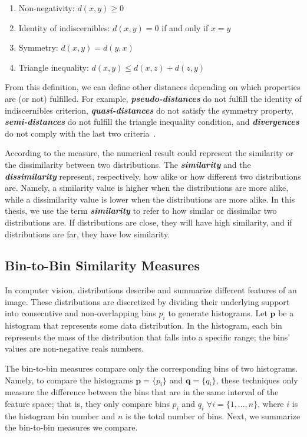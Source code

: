 \begin{enumerate}%
 \item Non-negativity: $d(x, y)\geq 0$
 \item Identity of indiscernibles: $d(x, y) = 0$ if and only if $x = y$
 \item Symmetry: $d(x, y) = d(y, x)$
 \item Triangle inequality: $d(x, y) \leq d(x, z) + d(z, y)$
\end{enumerate}

From this definition, we can define other distances depending on which properties are (or not) fulfilled. For example, \textbf{\textit{pseudo-distances}} do not fulfill the identity of indiscernibles criterion, \textbf{\textit{quasi-distances}} do not satisfy the symmetry property, \textbf{\textit{semi-distances}} do not fulfill the triangle inequality condition, and \textbf{\textit{divergences}} do not comply with the last two criteria~\citep{Khamsi:JFPTA:2015}.

According to the measure, the numerical result could represent the similarity or the dissimilarity between two distributions. The \textbf{\textit{similarity}} and the \textbf{\textit{dissimilarity}} represent, respectively, how alike or how different two distributions are. Namely, a similarity value is higher when the distributions are more alike, while a dissimilarity value is lower when the distributions are more alike. In this thesis, we use the term \textbf{\textit{similarity}} to refer to how similar or dissimilar two distributions are. If distributions are close, they will have high similarity, and if distributions are far, they have low similarity.
 
\subsection{Bin-to-Bin Similarity Measures}
In computer vision, distributions describe and summarize different features of an image. These distributions are discretized by dividing their underlying support into consecutive and non-overlapping bins $p_i$ to generate histograms. Let $\mathbf{p}$ be a histogram that represents some data distribution. In the histogram, each bin represents the mass of the distribution that falls into a specific range; the bins' values are non-negative reals numbers.

The bin-to-bin measures compare only the corresponding bins of two histograms. Namely, to compare the histograms  $\mathbf{p} = \{p_i\}$ and $\mathbf{q} = \{q_i\}$, these techniques only measure the difference between the bins that are in the same interval of the feature space; that is, they only compare bins  $p_i$ and $q_i$ $\forall i=\{1, \ldots, n\}$, where $i$ is the histogram bin number and $n$ is the total number of bins. Next, we summarize the bin-to-bin measures we compare.

